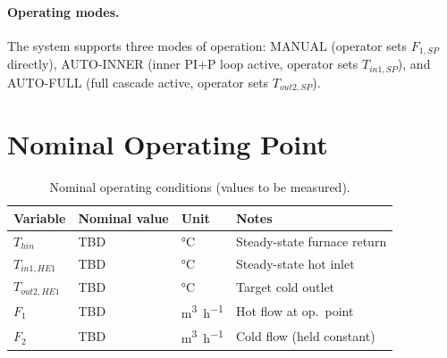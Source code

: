 \paragraph{Operating modes.}
The system supports three modes of operation:
MANUAL (operator sets $F_{1,SP}$ directly),
AUTO-INNER (inner PI+P loop active, operator sets $T_{in1,SP}$), and
AUTO-FULL (full cascade active, operator sets $T_{out2,SP}$).

\section{Nominal Operating Point}


\begin{table}[H]
  \centering
  \caption{Nominal operating conditions (values to be measured).}
  \label{tab:oppoint}
  \begin{tabular}{@{}L{4.5cm}C{2.5cm}C{2cm}L{4cm}@{}}
    \toprule
    \textbf{Variable} & \textbf{Nominal value} & \textbf{Unit} & \textbf{Notes} \\
    \midrule
    $T_{hin}$       & TBD & \si{\degreeCelsius} & Steady-state furnace return \\
    $T_{in1,HE1}$   & TBD & \si{\degreeCelsius} & Steady-state hot inlet \\
    $T_{out2,HE1}$  & TBD & \si{\degreeCelsius} & Target cold outlet \\
    $F_1$           & TBD & \si{\metre\cubed\per\hour} & Hot flow at op.\ point \\
    $F_2$           & TBD & \si{\metre\cubed\per\hour} & Cold flow (held constant) \\
    \bottomrule
  \end{tabular}
\end{table}
